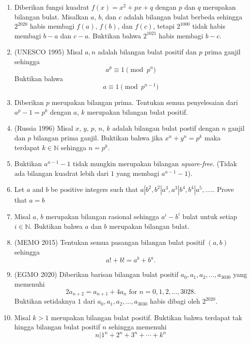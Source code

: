 \documentclass[12pt]{scrartcl}
\begin{document}
\begin{enumerate}[resume]
    \item  Diberikan fungsi kuadrat $f(x) = x^2 + px + q$ dengan $p$ dan $q$ merupakan bilangan bulat. Misalkan $a$, $b$, dan $c$ adalah bilangan bulat berbeda sehingga $2^2020$ habis membagi $f(a)$, $f(b)$, dan $f(c)$, tetapi $2^1000$ tidak habis membagi $b-a$ dan $c-a$. Buktikan bahwa $2^1021$ habis membagi $b-c$.
    
    \item (UNESCO 1995) Misal $a,n$ adalah bilangan bulat positif dan $p$ prima ganjil sehingga $$a^p \equiv 1 \pmod{p^n}$$ Buktikan bahwa $$a \equiv 1 \pmod{p^{n-1}}$$ 
    
    \item  Diberikan $p$ merupakan bilangan prima. Tentukan semua penyelesaian dari $a^p - 1 = p^k$ dengan $a$, $k$ merupakan bilangan bulat positif.
    
    \item (Russia 1996)  Misal $x$, $y$, $p$, $n$, $k$ adalah bilangan bulat postif dengan $n$ ganjil dan $p$ bilangan prima ganjil. Buktikan bahwa jika $x^n + y^n = p^k$ maka terdapat $k\in\mathbb{N}$ sehingga $n=p^k$. 
    
    \item  Buktikan $a^{a-1} - 1$ tidak mungkin merupakan bilangan \textit{square-free}. (Tidak ada bilangan kuadrat lebih dari $1$ yang membagi $a^{a-1} - 1$).
    
    \item Let $a$ and $b$ be positive integers such that $a|b^2,b^2|a^3,a^3|b^4,b^4|a^5,....$. Prove that $a=b$
    
    \item  Misal $a$, $b$ merupakan bilangan rasional sehingga $a^i - b^i$ bulat untuk setiap $i \in \mathbb{N}$. Buktikan bahwa $a$ dan $b$ merupakan bilangan bulat.
    
    \item (MEMO 2015) Tentukan semua pasangan bilangan bulat positif $(a,b)$ sehingga
    $$a!+b!=a^b + b^a.$$ 
    
    \item (EGMO 2020) Diberikan barisan bilangan bulat positif $a_0, a_1, a_2, \ldots, a_{3030}$ yang memenuhi $$2a_{n + 2} = a_{n + 1} + 4a_n \text{ for } n = 0, 1, 2, \ldots, 3028.$$
    Buktikan setidaknya $1$ dari $a_0, a_1, a_2, \ldots, a_{3030}$ habis dibagi oleh $2^{2020}$. 
    
    \item  Misal $ k > 1$ merupakan bilangan bulat positif. Buktikan bahwa terdapat tak hingga bilangan bulat positif $n$ sehingga memenuhi
    $$n | 1^n + 2^n + 3^n + \cdots +k^n$$


\end{enumerate}
\end{document}
